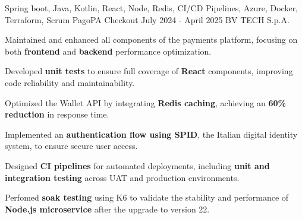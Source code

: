

\begin{cventries}

  \cventry
    {Spring boot, Java, Kotlin, React, Node, Redis, CI/CD Pipelines, Azure, Docker, Terraform, Scrum} %
    {PagoPA Checkout} %
    {July 2024 - April 2025} %
    {BV TECH S.p.A.} %
    {
      \begin{cvitems} %
        \item {Maintained and enhanced all components of the payments platform, focusing on both \textbf{frontend} and \textbf{backend} performance optimization.}
        \item {Developed \textbf{unit tests} to ensure full coverage of \textbf{React} components, improving code reliability and maintainability.}  
        \item {Optimized the Wallet API by integrating \textbf{Redis caching}, achieving an \textbf{60\% reduction} in response time.}  
        \item {Implemented an \textbf{authentication flow using SPID}, the Italian digital identity system, to ensure secure user access.}  
        \item {Designed \textbf{CI pipelines} for automated deployments, including \textbf{unit and integration testing} across UAT and production environments.}  
        \item {Perfomed \textbf{soak testing} using K6 to validate the stability and performance of \textbf{Node.js microservice} after the upgrade to version 22.}  
      \end{cvitems}
    }


\end{cventries}

